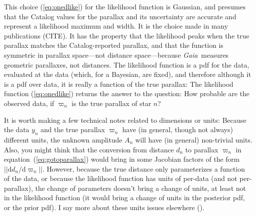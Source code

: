 \documentclass[12pt, modern]{aastex62}
\newcommand{\Gaia}{\textsl{Gaia}}
\newcommand{\equationname}{equation}
\newcommand{\dd}{\mathrm{d}}
\begin{document}
This choice (\ref{eq:onedlike}) for the likelihood function is Gaussian,
and presumes that the
Catalog values for the parallax and its uncertainty are accurate and represent
a likelihood maximum and width.
It is the choice made in many publications (CITE).
It has the property that the likelihood peaks when the true parallax
matches the Catalog-reported parallax,
and that the function is symmetric in parallax space---not distance space---because
\Gaia\ measures geometric parallaxes, not distances.
The likelihood function is a pdf for the data, evaluated at the data (which,
for a Bayesian, are fixed), and therefore although it is a pdf over data,
it is really a function of the true parallax:
The likelihood function (\ref{eq:onedlike}) returns the answer to the question:
How probable are the observed data, if $\varpi_n$ is the true parallax of
star $n$?

It is worth making a few technical notes related to dimensions or units:
Because the data $y_n$ and
the true parallax $\varpi_n$ have (in general, though not always) different units,
the unknown amplitude $A_n$ will have (in general) non-trivial units.
Also, you might think
that the conversion from distance $d_n$ to parallax $\varpi_n$
in \equationname~(\ref{eq:gotoparallax})
would bring in some Jacobian factors of the form $||\dd d_n/\dd\varpi_n||$.
However, because the true distance only parameterizes a function of the data,
or because the likelihood function has units of per-data (and not per-parallax),
the change of parameters doesn't bring a change of units, at least not in the
likelihood function (it would bring a change of units in the posterior pdf, or the
prior pdf).
I say more about these units issues elsewhere (\citealt{calculus}).
\end{document}
